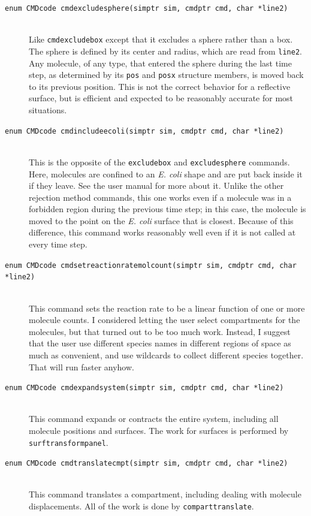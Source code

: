 \documentclass {scrbook}
\newcommand {\ttt} {\texttt}
\begin{document}
\begin{description}
\item[\ttt{enum CMDcode cmdexcludesphere(simptr sim, cmdptr cmd, char *line2)}]
\hfill \\
Like \ttt{cmdexcludebox} except that it excludes a sphere rather than a box. The sphere is defined by its center and radius, which are read from \ttt{line2}. Any molecule, of any type, that entered the sphere during the last time step, as determined by its \ttt{pos} and \ttt{posx} structure members, is moved back to its previous position. This is not the correct behavior for a reflective surface, but is efficient and expected to be reasonably accurate for most situations.

\item[\ttt{enum CMDcode cmdincludeecoli(simptr sim, cmdptr cmd, char *line2)}]
\hfill \\
This is the opposite of the \ttt{excludebox} and \ttt{excludesphere} commands. Here, molecules are confined to an \emph{E. coli} shape and are put back inside it if they leave. See the user manual for more about it. Unlike the other rejection method commands, this one works even if a molecule was in a forbidden region during the previous time step; in this case, the molecule is moved to the point on the \emph{E. coli} surface that is closest. Because of this difference, this command works reasonably well even if it is not called at every time step.

\item[\ttt{enum CMDcode cmdsetreactionratemolcount(simptr sim, cmdptr cmd, char *line2)}]
\hfill \\
This command sets the reaction rate to be a linear function of one or more molecule counts. I considered letting the user select compartments for the molecules, but that turned out to be too much work. Instead, I suggest that the user use different species names in different regions of space as much as convenient, and use wildcards to collect different species together. That will run faster anyhow.

\item[\ttt{enum CMDcode cmdexpandsystem(simptr sim, cmdptr cmd, char *line2)}]
\hfill \\
This command expands or contracts the entire system, including all molecule positions and surfaces. The work for surfaces is performed by \ttt{surftransformpanel}.

\item[\ttt{enum CMDcode cmdtranslatecmpt(simptr sim, cmdptr cmd, char *line2)}]
\hfill \\
This command translates a compartment, including dealing with molecule displacements. All of the work is done by \ttt{comparttranslate}.


\end{description}
\end{document}
